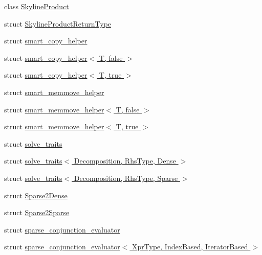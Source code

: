 \begin{DoxyCompactItemize}
\item 
class \hyperlink{class_eigen_1_1internal_1_1_skyline_product}{Skyline\+Product}
\item 
struct \hyperlink{struct_eigen_1_1internal_1_1_skyline_product_return_type}{Skyline\+Product\+Return\+Type}
\item 
struct \hyperlink{struct_eigen_1_1internal_1_1smart__copy__helper}{smart\+\_\+copy\+\_\+helper}
\item 
struct \hyperlink{struct_eigen_1_1internal_1_1smart__copy__helper_3_01_t_00_01false_01_4}{smart\+\_\+copy\+\_\+helper$<$ T, false $>$}
\item 
struct \hyperlink{struct_eigen_1_1internal_1_1smart__copy__helper_3_01_t_00_01true_01_4}{smart\+\_\+copy\+\_\+helper$<$ T, true $>$}
\item 
struct \hyperlink{struct_eigen_1_1internal_1_1smart__memmove__helper}{smart\+\_\+memmove\+\_\+helper}
\item 
struct \hyperlink{struct_eigen_1_1internal_1_1smart__memmove__helper_3_01_t_00_01false_01_4}{smart\+\_\+memmove\+\_\+helper$<$ T, false $>$}
\item 
struct \hyperlink{struct_eigen_1_1internal_1_1smart__memmove__helper_3_01_t_00_01true_01_4}{smart\+\_\+memmove\+\_\+helper$<$ T, true $>$}
\item 
struct \hyperlink{struct_eigen_1_1internal_1_1solve__traits}{solve\+\_\+traits}
\item 
struct \hyperlink{struct_eigen_1_1internal_1_1solve__traits_3_01_decomposition_00_01_rhs_type_00_01_dense_01_4}{solve\+\_\+traits$<$ Decomposition, Rhs\+Type, Dense $>$}
\item 
struct \hyperlink{struct_eigen_1_1internal_1_1solve__traits_3_01_decomposition_00_01_rhs_type_00_01_sparse_01_4}{solve\+\_\+traits$<$ Decomposition, Rhs\+Type, Sparse $>$}
\item 
struct \hyperlink{struct_eigen_1_1internal_1_1_sparse2_dense}{Sparse2\+Dense}
\item 
struct \hyperlink{struct_eigen_1_1internal_1_1_sparse2_sparse}{Sparse2\+Sparse}
\item 
struct \hyperlink{struct_eigen_1_1internal_1_1sparse__conjunction__evaluator}{sparse\+\_\+conjunction\+\_\+evaluator}
\item 
struct \hyperlink{struct_eigen_1_1internal_1_1sparse__conjunction__evaluator_3_01_xpr_type_00_01_index_based_00_01_iterator_based_01_4}{sparse\+\_\+conjunction\+\_\+evaluator$<$ Xpr\+Type, Index\+Based, Iterator\+Based $>$}
\item 

\end{DoxyCompactItemize}
